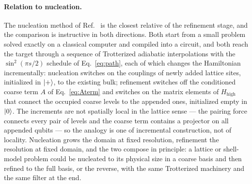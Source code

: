 \documentclass[
  aps,            %
  prc,            %
  reprint,        %
  superscriptaddress,
  floatfix,
  nofootinbib
]{revtex4-2}
\newcommand{\Hhigh}{H_{\mathrm{high}}}
\begin{document}
\paragraph{Relation to nucleation.}
The nucleation method of Ref.~\cite{Sadia2026} is the closest relative of the
refinement stage, and the comparison is instructive in both directions.  Both
start from a small problem solved exactly on a classical computer and compiled
into a circuit, and both reach the target through a sequence of Trotterized
adiabatic interpolations with the $\sin^2(\pi s/2)$ schedule of
Eq.~\eqref{eq:path}, each of which changes the Hamiltonian incrementally:
nucleation switches on the couplings of newly added lattice sites, initialized
in $\ket{+}$, to the existing bulk; refinement switches off the conditioned
coarse term $A$ of Eq.~\eqref{eq:Aterm} and switches on the matrix elements of
$\Hhigh$ that connect the occupied coarse levels to the appended ones,
initialized empty in $\ket{0}$.  The increments are not spatially local in
the lattice sense --- the pairing force connects every pair of levels and
the coarse term contains a projector on all appended qubits --- so the
analogy is one of incremental construction, not of locality.  Nucleation grows the domain at fixed
resolution, refinement the resolution at fixed domain, and the two compose in
principle: a lattice or shell-model problem could be nucleated to its physical
size in a coarse basis and then refined to the full basis, or the reverse,
with the same Trotterized machinery and the same filter at the end.
\end{document}
